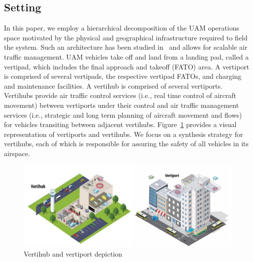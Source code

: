 \subsection{Setting}
 In this paper, we employ a hierarchical decomposition of the UAM operations space motivated by the physical and geographical infrastructure required to field the system. Such an architecture has been studied in~\cite{bhnfm,bhTCNS} and allows for scalable air traffic management.  UAM vehicles take off and land from a landing pad, called a vertipad, which includes the final approach and takeoff (FATO) area.  A vertiport is comprised of several vertipads, the respective vertipad FATOs, and charging and maintenance facilities.  A vertihub is comprised of several vertiports.  Vertihubs provide air traffic control services (i.e., real time control of aircraft movement) between vertiports under their control and air traffic management services (i.e., strategic and long term planning of aircraft movement and flows) for vehicles transiting between adjacent vertihubs.  Figure~\ref{fig:uam_architecture} provides a visual representation of vertiports and vertihubs.  We focus on a synthesis strategy for vertihubs, each of which is responsible for assuring the safety of all vehicles in its airspace.  


\begin{figure}
    \centering
    \includegraphics[width=0.98\columnwidth]{UAM-NFM/Figures/vert.PNG}
    \caption{Vertihub and vertiport depiction}
     \label{fig:uam_architecture}
\end{figure}

